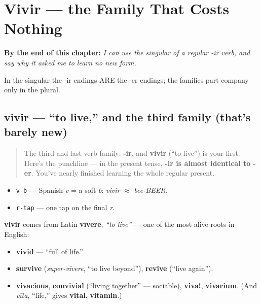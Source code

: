 
\chapter{Vivir --- the Family That Costs Nothing}
\label{ch:spanish-vivir}

\begin{chapteropening}
\textbf{By the end of this chapter:} \emph{I can use the singular of a regular -ir verb, and say why it asked me to learn no new form.}

In the singular the -ir endings ARE the -er endings; the families part company only in the plural.
\end{chapteropening}

\section[vivir]{vivir — \textquotedblleft{}to live,\textquotedblright{} and the third family (that's barely new)}

\label{lesson:ES-C07-vivir}



\begin{quote}
The third and last verb family: \textbf{-ir}, and \textbf{vivir} (\textquotedblleft{}to live\textquotedblright{}) is your first. Here's the punchline — in the present tense, \textbf{-ir is almost identical to -er}. You've nearly finished learning the whole regular present.
\end{quote}

\begin{sounds}
\begin{itemize}
\raggedright
  \item \texttt{v-b} — Spanish \emph{v} = a soft \emph{b}: \emph{vivir} $\approx$ \emph{bee-BEER}.
  \item \texttt{r-tap} — one tap on the final \emph{r}.
\end{itemize}
\end{sounds}

\begin{cousinweb}
\textbf{vivir} comes from Latin \textbf{vīvere}, \emph{\textquotedblleft{}to live\textquotedblright{}} — one of the most alive roots in English:

\begin{itemize}
\raggedright
  \item \textbf{vivid} — \textquotedblleft{}full of life.\textquotedblright{}
  \item \textbf{survive} (\emph{super-vīvere}, \textquotedblleft{}to live beyond\textquotedblright{}), \textbf{revive} (\textquotedblleft{}live again\textquotedblright{}).
  \item \textbf{vivacious}, \textbf{convivial} (\textquotedblleft{}living together\textquotedblright{} — sociable), \textbf{viva!}, \textbf{vivarium}. (And \emph{vīta}, \textquotedblleft{}life,\textquotedblright{} gives \textbf{vital}, \textbf{vitamin}.)
\end{itemize}
\end{cousinweb}

